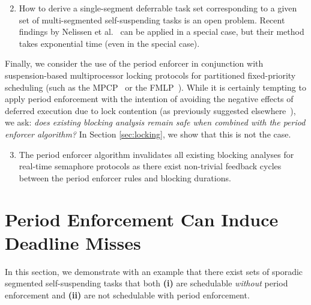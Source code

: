 \begin{enumerate}
\setcounter{enumi}{1}
	\item How to derive a single-segment deferrable task set corresponding to a given set of  multi-segmented self-suspending tasks is an open problem. Recent findings by Nelissen et al.~\cite{ecrts15nelissen} can be applied in a special case, but their method takes exponential time (even in the  special case).
\end{enumerate}

Finally, we consider the use of the period enforcer in conjunction with suspension-based multiprocessor locking protocols for partitioned fixed-priority scheduling (such as the MPCP~\cite{LNR:09,Ra:90} or the FMLP~\cite{BLBA:07,BA:08}). While it is certainly tempting to apply period enforcement with the intention of avoiding the negative effects of deferred execution due to lock contention (as previously suggested elsewhere~\cite{Raj:91,Lak:11,LNR:09}), we ask: \emph{does existing blocking analysis remain safe when combined with the period enforcer algorithm?} In Section \ref{sec:locking}, we show that this is not the case.

\begin{enumerate}
\setcounter{enumi}{2}
	\item The period enforcer algorithm invalidates all existing blocking analyses for real-time semaphore protocols as there exist non-trivial feedback cycles between the period enforcer rules and blocking durations.
\end{enumerate}



\section{Period Enforcement Can Induce Deadline Misses}
\label{sec:unschedulable}

In this section, we demonstrate with an example that there exist sets of sporadic  segmented self-suspending tasks that both \textbf{(i)} are schedulable \emph{without} period enforcement and \textbf{(ii)} are not schedulable with period enforcement.

